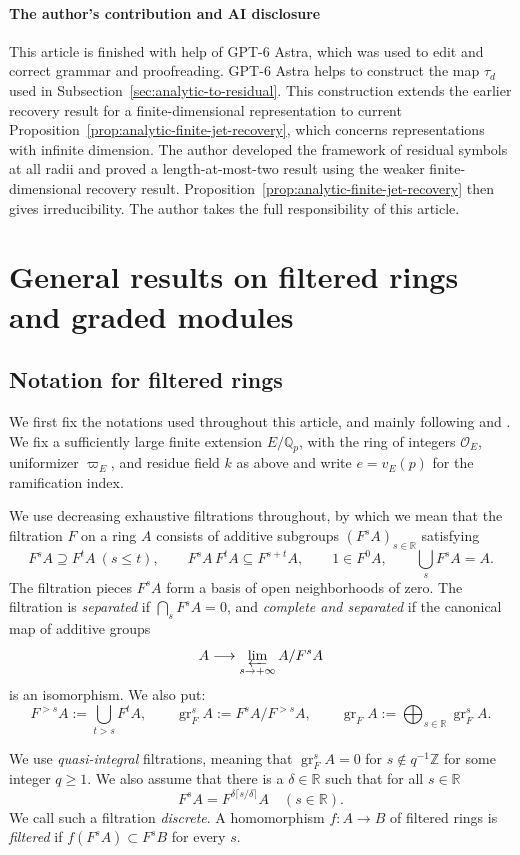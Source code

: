 \documentclass[11pt]{article}
\theoremstyle{definition}
\newcommand{\cO}{\mathcal O}
\newcommand{\gr}{\operatorname{gr}}
\begin{document}
\paragraph{The author's contribution and AI disclosure} This article is finished with help of GPT-6 Astra, which was used to edit and correct grammar and proofreading. GPT-6 Astra helps to construct the map $\tau_d$ used in Subsection~\ref{sec:analytic-to-residual}.
This construction extends the earlier recovery result for a finite-dimensional representation to current Proposition~\ref{prop:analytic-finite-jet-recovery}, which concerns representations with infinite dimension.
The author developed the framework of residual symbols at all radii and proved a length-at-most-two result using the weaker finite-dimensional recovery result. Proposition~\ref{prop:analytic-finite-jet-recovery} then gives irreducibility.
The author takes the full responsibility of this article. 
\section{General results on filtered rings and graded modules}
\label{sec:two-filtrations}
\subsection{Notation for filtered rings}
\label{sec:filtered-notions}
We first fix the notations used throughout this article, and mainly 
following \cite[\S\S1,3]{ST03} and
\cite[\S1.3 and \S2]{Sorgdrager2026}.
We fix a sufficiently large finite extension $E/\mathbb{Q}_p$, with the ring of integers $\cO_E$, uniformizer $\varpi_E$, and residue field $k$ as above 
and write $e=v_E(p)$ for the ramification index. 

We use decreasing exhaustive filtrations throughout, 
by which we mean that the filtration $F$ on a ring $A$ consists of additive
subgroups $(F^sA)_{s\in\mathbb R}$ satisfying
\[
 F^sA\supseteq F^tA\ (s\leq t),\qquad
 F^sA\,F^tA\subseteq F^{s+t}A,\qquad
 1\in F^0A,\qquad \bigcup_sF^sA=A.
\]
The filtration pieces $F^sA$ form a basis of open neighborhoods 
of zero. The filtration is \emph{separated} if $\bigcap_sF^sA=0$,
and \emph{complete and separated} if the canonical map of additive groups
\[
 A\longrightarrow\varprojlim_{s\to+\infty}A/F^sA
\]
is an isomorphism. We also put: 
\[
 F^{>s}A:=\bigcup_{t>s}F^tA,\qquad
 \gr_F^sA:=F^sA/F^{>s}A,\qquad
 \gr_FA:=\bigoplus_{s\in\mathbb R}\gr_F^sA.
\]

We use \emph{quasi-integral} filtrations, meaning that
$\gr_F^sA=0$ for $s\notin q^{-1}\mathbb Z$ for some integer $q\geq1$.
We also assume that there is a $\delta\in \mathbb{R}$ such that for all $s\in\mathbb{R}$
\[
 F^sA=F^{\delta\lceil s/\delta\rceil}A
 \quad(s\in\mathbb R).
\] We call such a filtration \emph{discrete}.
A homomorphism $f\colon A\to B$ of filtered rings is \emph{filtered} if 
$f(F^sA)\subset F^sB$ for every $s$.
\end{document}
